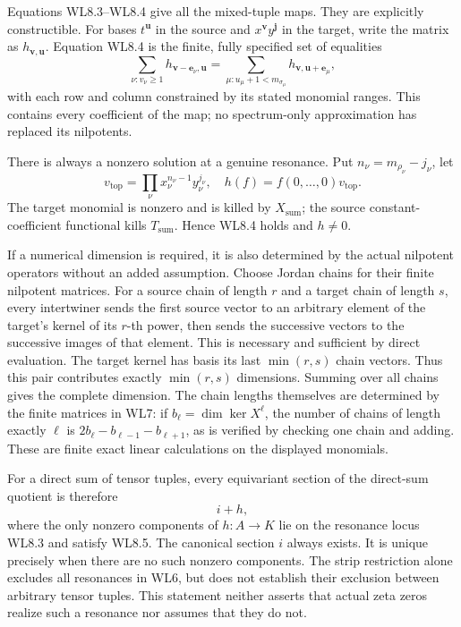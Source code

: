 Equations WL8.3--WL8.4 give all the mixed-tuple maps. They are
explicitly constructible. For bases \(t^{\mathbf u}\) in the source and
\(x^{\mathbf v}y^{\mathbf j}\) in the target, write the matrix as
\(h_{\mathbf v,\mathbf u}\). Equation WL8.4 is the finite, fully
specified set of equalities \[
 \sum_{\nu:v_\nu\geq1}h_{\mathbf v-\mathbf e_\nu,\mathbf u}
 =
 \sum_{\mu:u_\mu+1<m_{\sigma_\mu}}
 h_{\mathbf v,\mathbf u+\mathbf e_\mu},
\tag{WL8.5}
\] with each row and column constrained by its stated monomial ranges.
This contains every coefficient of the map; no spectrum-only
approximation has replaced its nilpotents.

There is always a nonzero solution at a genuine resonance. Put
\(n_\nu=m_{\rho_\nu}-j_\nu\), let \[
 v_{\mathrm{top}}=
 \prod_\nu x_\nu^{n_\nu-1}y_\nu^{j_\nu},
\quad
 h(f)=f(0,\ldots,0)v_{\mathrm{top}}.
\tag{WL8.6}
\] The target monomial is nonzero and is killed by \(X_{\mathrm{sum}}\);
the source constant-coefficient functional kills \(T_{\mathrm{sum}}\).
Hence WL8.4 holds and \(h\ne0\).

If a numerical dimension is required, it is also determined by the
actual nilpotent operators without an added assumption. Choose Jordan
chains for their finite nilpotent matrices. For a source chain of length
\(r\) and a target chain of length \(s\), every intertwiner sends the
first source vector to an arbitrary element of the target's kernel of
its \(r\)-th power, then sends the successive vectors to the successive
images of that element. This is necessary and sufficient by direct
evaluation. The target kernel has basis its last \(\min(r,s)\) chain
vectors. Thus this pair contributes exactly \(\min(r,s)\) dimensions.
Summing over all chains gives the complete dimension. The chain lengths
themselves are determined by the finite matrices in WL7: if
\(b_\ell=\dim\ker X^\ell\), the number of chains of length exactly
\(\ell\) is \(2b_\ell-b_{\ell-1}-b_{\ell+1}\), as is verified by
checking one chain and adding. These are finite exact linear
calculations on the displayed monomials.

For a direct sum of tensor tuples, every equivariant section of the
direct-sum quotient is therefore \[
 i+h,
\] where the only nonzero components of \(h:A\to K\) lie on the
resonance locus WL8.3 and satisfy WL8.5. The canonical section \(i\)
always exists. It is unique precisely when there are no such nonzero
components. The strip restriction alone excludes all resonances in WL6,
but does not establish their exclusion between arbitrary tensor tuples.
This statement neither asserts that actual zeta zeros realize such a
resonance nor assumes that they do not.

